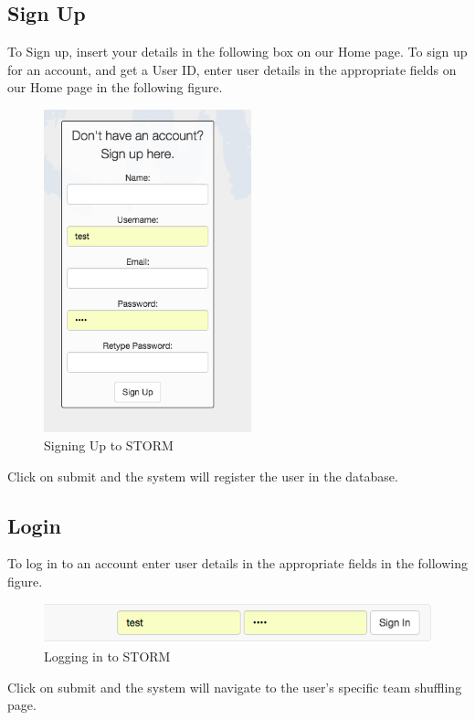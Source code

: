 \subsection{Sign Up}\par

To Sign up, insert your details in the following box on our Home page.
To sign up for an account, and get a User ID, enter user details in the appropriate fields on our Home page in the following figure.\par

 \begin{figure}[H] 
	\centering
	\includegraphics[width=6cm]{./graphics/StormUMSU1.jpg}\par
	\caption{Signing Up to STORM}
\end{figure}
Click on submit and the system will register the user in the database.

\subsection{Login}\par
To log in to an account enter user details in the appropriate fields in the following figure.\par
 \begin{figure}[H] 
	\centering
	\includegraphics[width=13cm]{./graphics/StormUMSU2.jpg}\par
	\caption{Logging in to STORM}
\end{figure}
Click on submit and the system will navigate to the user's specific team shuffling page.

